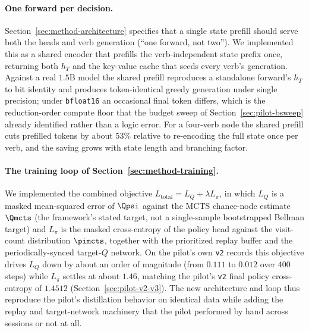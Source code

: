 \paragraph{One forward per decision.}
Section~\ref{sec:method-architecture} specifies that a single state prefill
should serve both the heads and verb generation (``one forward, not two''). We
implemented this as a shared encoder that prefills the verb-independent state
prefix once, returning both $h_T$ and the key-value cache that seeds every
verb's generation. Against a real $1.5$B model the shared prefill reproduces a
standalone forward's $h_T$ to bit identity and produces token-identical greedy
generation under single precision; under \texttt{bfloat16} an occasional final
token differs, which is the reduction-order compute floor that the budget sweep
of Section~\ref{sec:pilot-bsweep} already identified rather than a logic error.
For a four-verb node the shared prefill cuts prefilled tokens by about $53\%$
relative to re-encoding the full state once per verb, and the saving grows with
state length and branching factor.

\paragraph{The training loop of Section~\ref{sec:method-training}.}
We implemented the combined objective
$L_{\mathrm{total}} = L_Q + \lambda L_{\pi}$, in which $L_Q$ is a masked
mean-squared error of $\Qpsi$ against the MCTS chance-node estimate $\Qmcts$
(the framework's stated target, not a single-sample bootstrapped Bellman
target) and $L_{\pi}$ is the masked cross-entropy of the policy head against
the visit-count distribution $\pimcts$, together with the prioritized replay
buffer and the periodically-synced target-$Q$ network. On the pilot's own
\texttt{v2} records this objective drives $L_Q$ down by about an order of
magnitude (from $0.111$ to $0.012$ over $400$ steps) while $L_{\pi}$ settles at
about $1.46$, matching the pilot's \texttt{v2} final policy cross-entropy of
$1.4512$ (Section~\ref{sec:pilot-v2-v3}). The new architecture and loop thus
reproduce the pilot's distillation behavior on identical data while adding the
replay and target-network machinery that the pilot performed by hand across
sessions or not at all.

